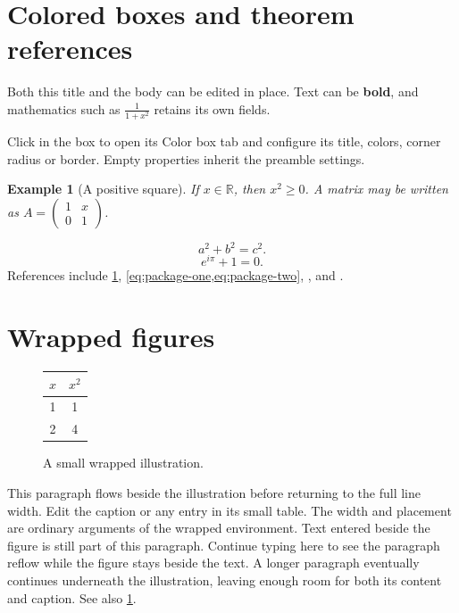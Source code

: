 \documentclass[12pt]{article}
\newtheorem{example}{Example}[section]
\begin{document}
\section{Colored boxes and theorem references}
\begin{tcolorbox}[title={An editable title with $x^2$},colback=blue!5,colframe=blue!60!black]
Both this title and the body can be edited in place. Text can be
\textbf{bold}, and mathematics such as $\frac{1}{1+x^2}$ retains its own fields.
\end{tcolorbox}
Click in the box to open its Color box tab and configure its title, colors,
corner radius or border. Empty properties inherit the preamble settings.

\begin{example}[A positive square]\label{ex:square}
If $x\in\mathbb{R}$, then $x^2\geq0$. A matrix may be written as
$A=\begin{pmatrix}1&x\\0&1\end{pmatrix}$.
\end{example}
\begin{equation}\label{eq:package-one} a^2+b^2=c^2.\end{equation}
\begin{equation}\label{eq:package-two} e^{i\pi}+1=0.\end{equation}
References include \cref{ex:square}, \cref{eq:package-one,eq:package-two},
, and .

\section{Wrapped figures}
\begin{figure}
\centering
\begin{tabular}{|c|c|}\hline$x$&$x^2$\\\hline1&1\\2&4\\\hline\end{tabular}
\caption{A small wrapped illustration.}\label{fig:wrapped}
\end{figure}
This paragraph flows beside the illustration before returning to the full
line width. Edit the caption or any entry in its small table. The width and
placement are ordinary arguments of the wrapped environment. Text entered
beside the figure is still part of this paragraph. Continue typing here to
see the paragraph reflow while the figure stays beside the text. A longer
paragraph eventually continues underneath the illustration, leaving enough
room for both its content and caption. See also \cref{fig:wrapped}.
\end{document}
